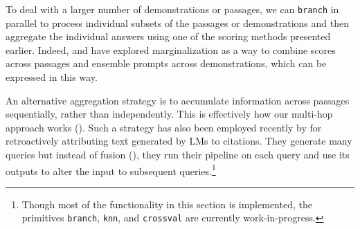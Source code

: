 To deal with a larger number of demonstrations or passages, we can \texttt{branch} in parallel to process individual subsets of the passages or demonstrations and then aggregate the individual answers using one of the scoring methods presented earlier. Indeed, \citet{lewis2020retrieval} and \citet{lazaridou2022internet} have explored marginalization as a way to combine scores across passages and \citet{le2022few} ensemble prompts across demonstrations, which can be expressed in this way.


An alternative aggregation strategy is to accumulate information across passages sequentially, rather than independently. This is effectively how our multi-hop approach works (). Such a strategy has also been employed recently by \citet{gao2022attributed} for retroactively attributing text generated by LMs to citations. They generate many queries but instead of fusion (), they run their pipeline on each query and use its outputs to alter the input to subsequent queries.\footnote{Though most of the functionality in this section is implemented, the primitives \texttt{branch}, \texttt{knn}, and \texttt{crossval} are currently work-in-progress.}






 
























